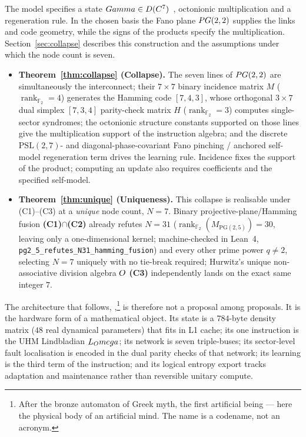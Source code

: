 The \TALOS{} model specifies a state
$Gamma\in D(C^7)$~\cite{uhm2026}, octonionic multiplication and
a regeneration rule. In the chosen basis the Fano plane $PG(2,2)$ supplies
the links and code geometry, while the signs of the products specify the
multiplication. Section~\ref{sec:collapse} describes this construction and
the assumptions under which the node count is seven.

\begin{itemize}[leftmargin=1.5em,itemsep=1pt]
  \item \textbf{Theorem~\ref{thm:collapse} (Collapse).} The seven lines of
        $PG(2,2)$ are simultaneously the interconnect; their $7\times 7$ binary
        incidence matrix $M$ ($\operatorname{rank}_{\mathbb{F}_2}=4$) generates
        the Hamming code $[7,4,3]$, whose orthogonal $3\times 7$ dual simplex
        $[7,3,4]$ parity-check matrix $H$ ($\operatorname{rank}_{\mathbb{F}_2}=3$)
        computes single-sector syndromes; the octonionic structure constants
        supported on those lines give the multiplication support of the
        instruction algebra; and the discrete $\mathrm{PSL}(2,7)$- and
        diagonal-phase-covariant Fano pinching / anchored self-model
        regeneration term drives the learning rule. Incidence fixes the support
        of the product; computing an update also requires coefficients and the
        specified self-model.
  \item \textbf{Theorem~\ref{thm:unique} (Uniqueness).} This collapse is
        realisable under (C1)--(C3) at a \emph{unique} node count, $N=7$.
        Binary projective-plane/Hamming fusion \textbf{(C1)}$\cap$\textbf{(C2)}
        already refutes $N=31$ ($\operatorname{rank}_{\mathbb{F}_2}(M_{\mathrm{PG}(2,5)})=30$,
        leaving only a one-dimensional kernel; machine-checked in Lean~4,
        \texttt{pg2\_5\_refutes\_N31\_hamming\_fusion}) and every other prime
        power $q\neq 2$, selecting $N=7$ uniquely with no tie-break required;
        Hurwitz's unique non-associative division algebra $O$ \textbf{(C3)}
        independently lands on the exact same integer $7$.
\end{itemize}

The architecture that follows, \TALOS{},\footnote{After the bronze
automaton of Greek myth, the first artificial being --- here the physical
body of an artificial mind. The name is a codename, not an acronym.} is
therefore not a proposal among proposals. It is the hardware form of a
mathematical object. Its state is a $784$-byte density matrix ($48$ real
dynamical parameters) that fits in L1 cache; its one instruction is the UHM
Lindbladian $L_Omega$; its network is seven triple-buses; its sector-level
fault localisation is encoded in the dual parity checks of that network; its
learning is the third term of the instruction; and its logical entropy export
tracks adaptation and maintenance rather than reversible unitary compute.

